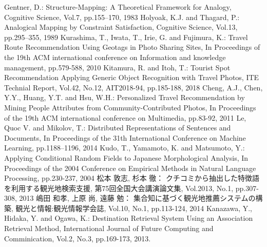 \documentclass[submit]{ipsj}
\begin{document}
\begin{thebibliography}{11}
    Gentner, D.:
      Structure-Mapping: A Theoretical Framework for Analogy,
      Cognitive Science, Vol.7, pp.155–170, 1983
    Holyoak, K.J. and Thagard, P.:
      Analogical Mapping by Constraint Satisfaction,
      Cognitive Science, Vol.13, pp.295–355, 1989
    Kurashima, T., Iwata, T., Irie, G. and Fujimura, K.:
      Travel Route Recommendation Using Geotags in Photo Sharing Sites,
      In Proceedings of the 19th ACM international conference on Information and knowledge management, pp.579-588, 2010
    Kitamura, R. and Itoh, T.:
      Tourist Spot Recommendation Applying Generic Object Recognition with Travel Photos,
      ITE Technial Report, Vol.42, No.12, AIT2018-94, pp.185-188, 2018
    Cheng, A.J., Chen, Y.Y., Huang, Y.T. and Hsu, W.H.:
      Personalized Travel Recommendation by Mining People Attributes from Community-Contributed Photos,
      In Proceedings of the 19th ACM international conference on Multimedia, pp.83-92, 2011
    Le, Quoc V. and Mikolov, T.:
      Distributed Representations of Sentences and Documents,
      In Proceedings of the 31th International Conference on Machine Learning, pp.1188–1196, 2014
    Kudo, T., Yamamoto, K. and Matsumoto, Y.:
      Applying Conditional Random Fields to Japanese Morphological Analysis,
      In Proceedings of the 2004 Conference on Empirical Methods in Natural Language Processing, pp.230-237, 2004
    松本 敦志, 杉本 徹：
      クチコミから抽出した特徴語を利用する観光地検索支援,
      第75回全国大会講演論文集, Vol.2013, No.1, pp.307-308, 2013
    嶋田 和孝, 上原 尚, 遠藤 勉：
      集合知に基づく観光地推薦システムの構築,
      観光と情報:観光情報学会誌, Vol.10, No.1, pp.113-124, 2014
    Kanazawa, Y., Hidaka, Y. and Ogawa, K.:
      Destination Retrieval System Using an Association Retrieval Method, International Journal of Future Computing and Comminication, Vol.2, No.3, pp.169-173, 2013.
\end{thebibliography}
\end{document}
